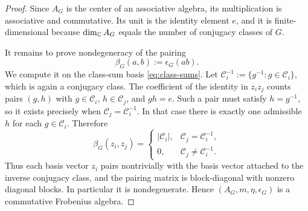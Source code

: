 \begin{proof}
Since $A_G$ is the center of an associative algebra, its multiplication is associative and commutative. Its unit is the identity element $e$, and it is finite-dimensional because $\dim_{\mathbb{C}} A_G$ equals the number of conjugacy classes of $G$.

\medskip

\noindent It remains to prove nondegeneracy of the pairing
\begin{equation}\label{eq:ZG-pairing}
\beta_G(a,b) := \epsilon_G(ab).
\end{equation}
We compute it on the class-sum basis \eqref{eq:class-sums}. Let $\mathcal{C}_i^{-1} := \{g^{-1} : g \in \mathcal{C}_i\}$, which is again a conjugacy class. The coefficient of the identity in $z_i z_j$ counts pairs $(g,h)$ with $g \in \mathcal{C}_i$, $h \in \mathcal{C}_j$, and $gh=e$. Such a pair must satisfy $h=g^{-1}$, so it exists precisely when $\mathcal{C}_j=\mathcal{C}_i^{-1}$. In that case there is exactly one admissible $h$ for each $g \in \mathcal{C}_i$. Therefore
\begin{equation}\label{eq:class-sum-pairing}
\beta_G(z_i,z_j) =
\begin{cases}
|\mathcal{C}_i|, & \mathcal{C}_j=\mathcal{C}_i^{-1},\\
0, & \mathcal{C}_j\neq \mathcal{C}_i^{-1}.
\end{cases}
\end{equation}
Thus each basis vector $z_i$ pairs nontrivially with the basis vector attached to the inverse conjugacy class, and the pairing matrix is block-diagonal with nonzero diagonal blocks. In particular it is nondegenerate. Hence $(A_G,m,\eta,\epsilon_G)$ is a commutative Frobenius algebra.
\end{proof}

